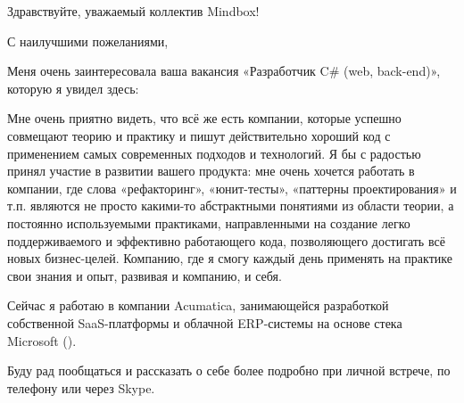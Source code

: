 


\date{1 марта 2014}
\opening{Здравствуйте, уважаемый коллектив Mindbox!}
\closing{С наилучшими пожеланиями,}
\makelettertitle

Меня очень заинтересовала ваша вакансия «Разработчик C\# (web, back-end)», которую я увидел здесь: \protect{}

Мне очень приятно видеть, что всё же есть компании, которые успешно совмещают теорию и практику и пишут действительно хороший код с применением самых современных подходов и технологий. Я бы с радостью принял участие в развитии вашего продукта: мне очень хочется работать в компании, где слова «рефакторинг», «юнит-тесты», «паттерны проектирования» и т.п. являются не просто какими-то абстрактными понятиями из области теории, а постоянно используемыми практиками, направленными на создание легко поддерживаемого и эффективно работающего кода, позволяющего достигать всё новых бизнес-целей. Компанию, где я смогу каждый день применять на практике свои знания и опыт, развивая и компанию, и себя.

Сейчас я работаю в компании Acumatica, занимающейся разработкой собственной SaaS-платформы и облачной ERP-системы на основе стека Microsoft (\protect{}).

Буду рад пообщаться и рассказать о себе более подробно при личной встрече, по телефону или через Skype.

\makeletterclosing
